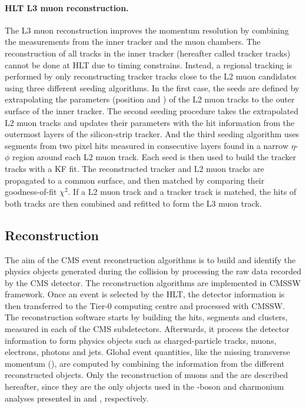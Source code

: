 \paragraph{HLT L3 muon reconstruction.} The L3 muon reconstruction improves the momentum resolution by combining the measurements from the inner tracker and the muon chambers. The reconstruction of all tracks in the inner tracker (hereafter called tracker tracks) cannot be done at HLT due to timing constrains. Instead, a regional tracking is performed by only reconstructing tracker tracks close to the L2 muon candidates using three different seeding algorithms. In the first case, the seeds are defined by extrapolating the parameters (position and \pt) of the L2 muon tracks to the outer surface of the inner tracker. The second seeding procedure takes the extrapolated L2 muon tracks and updates their parameters with the hit information from the outermost layers of the silicon-strip tracker. And the third seeding algorithm uses segments from two pixel hits measured in consecutive layers found in a narrow $\eta$-$\phi$ region around each L2 muon track. Each seed is then used to build the tracker tracks with a KF fit. The reconstructed tracker and L2 muon tracks are propagated to a common surface, and then matched by comparing their goodness-of-fit $\chi^{2}$. If a L2 muon track and a tracker track is matched, the hits of both tracks are then combined and refitted to form the L3 muon track.


\subsection{Reconstruction}\label{sec:Experiment_CMS_Reconstruction}

The aim of the CMS event reconstruction algorithms is to build and identify the physics objects generated during the collision by processing the raw data recorded by the CMS detector. The reconstruction algorithms are implemented in CMSSW framework. Once an event is selected by the HLT, the detector information is then transferred to the Tier-0 computing centre and processed with CMSSW. The reconstruction software starts by building the hits, segments and clusters, measured in each of the CMS subdetectors. Afterwards, it process the detector information to form physics objects such as charged-particle tracks, muons, electrons, photons and jets. Global event quantities, like the missing transverse momentum (\ptmiss), are computed by combining the information from the different reconstructed objects. Only the reconstruction of muons and the \ptmiss are described hereafter, since they are the only objects used in the \Wb-boson and charmonium analyses presented in  and , respectively.


